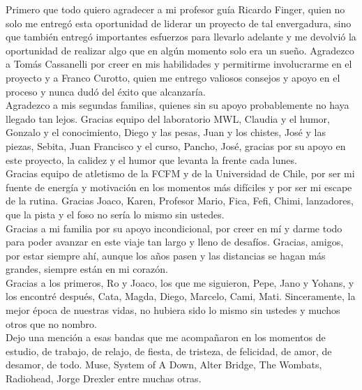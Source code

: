 \documentclass[
	spanish, %
	letterpaper, oneside
]{book}
\begin{document}
\begin{acknowledgments}
	Primero que todo quiero agradecer a mi profesor guía Ricardo Finger, quien no solo me entregó esta oportunidad de liderar un proyecto de tal envergadura, sino que también entregó importantes esfuerzos para llevarlo adelante y me devolvió la oportunidad de realizar algo que en algún momento solo era un sueño. Agradezco a Tomás Cassanelli por creer en mis habilidades y permitirme involucrarme en el proyecto y a Franco Curotto, quien me entrego valiosos consejos y apoyo en el proceso y nunca dudó del éxito que alcanzaría.\\

	Agradezco a mis segundas familias, quienes sin su apoyo probablemente no haya llegado tan lejos. Gracias equipo del laboratorio MWL, Claudia y el humor, Gonzalo y el conocimiento, Diego y las pesas, Juan y los chistes, José y las piezas, Sebita, Juan Francisco y el curso, Pancho, José, gracias por su apoyo en este proyecto, la calidez y el humor que levanta la frente cada lunes.\\

	Gracias equipo de atletismo de la FCFM y de la Universidad de Chile, por ser mi fuente de energía y motivación en los momentos más difíciles y por ser mi escape de la rutina. Gracias Joaco, Karen, Profesor Mario, Fica, Fefi, Chimi, lanzadores, que la pista y el foso no sería lo mismo sin ustedes.\\

	Gracias a mi familia por su apoyo incondicional, por creer en mí y darme todo para poder avanzar en este viaje tan largo y lleno de desafíos. Gracias, amigos, por estar siempre ahí, aunque los años pasen y las distancias se hagan más grandes, siempre están en mi corazón.\\

	Gracias a los primeros, Ro y Joaco, los que me siguieron, Pepe, Jano y Yohans, y los encontré después, Cata, Magda, Diego, Marcelo, Cami, Mati. Sinceramente, la mejor época de nuestras vidas, no hubiera sido lo mismo sin ustedes y muchos otros que no nombro.\\

	Dejo una mención a esas bandas que me acompañaron en los momentos de estudio, de trabajo, de relajo, de fiesta, de tristeza, de felicidad, de amor, de desamor, de todo. Muse, System of A Down, Alter Bridge, The Wombats, Radiohead, Jorge Drexler entre muchas otras.\\
\end{acknowledgments}

\templateIndex

\templateFinalcfg













\end{document}

